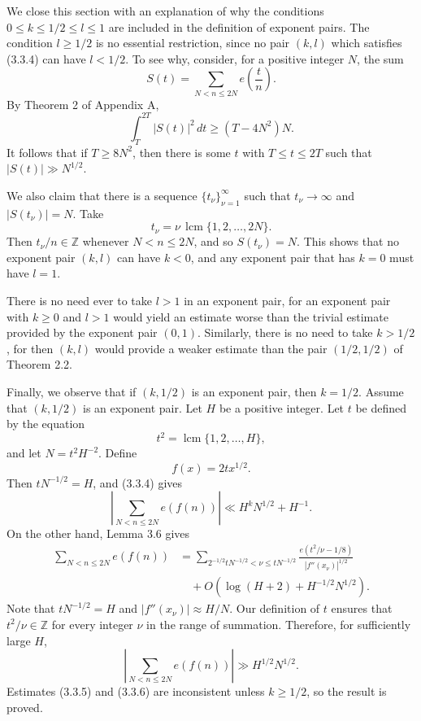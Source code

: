 \documentclass[10pt]{article}
\newcommand{\lcmop}{\operatorname{lcm}}
\begin{document}
We close this section with an explanation of why the conditions
$0\leq k\leq1/2\leq l\leq1$ are included in the definition of exponent
pairs. The condition $l\geq1/2$ is no essential restriction, since no pair
$(k,l)$ which satisfies (3.3.4) can have $l<1/2$. To see why, consider, for a positive integer $N$, the sum
\[
 S(t)=\sum_{N<n\leq2N}e\left(\frac tn\right).
\]
By Theorem 2 of Appendix A,
\[
 \int_T^{2T}|S(t)|^2\,dt\geq(T-4N^2)N.
\]
It follows that if $T\geq8N^2$, then there is some $t$ with
$T\leq t\leq2T$ such that $|S(t)|\gg N^{1/2}$.

We also claim that there is a sequence $\{t_\nu\}_{\nu=1}^{\infty}$ such that
$t_\nu\to\infty$ and $|S(t_\nu)|=N$. Take
\[
 t_\nu=\nu\,\lcmop\{1,2,\ldots,2N\}.
\]
Then $t_\nu/n\in\mathbb Z$ whenever $N<n\leq2N$, and so $S(t_\nu)=N$.
This shows that no exponent pair $(k,l)$ can have $k<0$, and any exponent pair
that has $k=0$ must have $l=1$.

There is no need ever to take $l>1$ in an exponent pair, for an exponent pair
with $k\geq0$ and $l>1$ would yield an estimate worse than the trivial
estimate provided by the exponent pair $(0,1)$. Similarly, there is no need
to take $k>1/2$, for then $(k,l)$ would provide a weaker estimate than the
pair $(1/2,1/2)$ of Theorem 2.2.

Finally, we observe that if $(k,1/2)$ is an exponent pair, then $k=1/2$.
Assume that $(k,1/2)$ is an exponent pair. Let $H$ be a positive integer. Let
$t$ be defined by the equation
\[
 t^2=\lcmop\{1,2,\ldots,H\},
\]
and let $N=t^2H^{-2}$. Define
\[
 f(x)=2t x^{1/2}.
\]
Then $tN^{-1/2}=H$, and (3.3.4) gives
\begin{equation*}
 \left|\sum_{N<n\leq2N}e(f(n))\right|
 \ll H^kN^{1/2}+H^{-1}. \tag{3.3.5}
\end{equation*}
On the other hand, Lemma 3.6 gives
\[
\begin{aligned}
 \sum_{N<n\leq2N}e(f(n))
 &=\sum_{2^{-1/2}tN^{-1/2}<\nu\leq tN^{-1/2}}
  \frac{e(t^2/\nu-1/8)}{|f''(x_\nu)|^{1/2}}\\
 &\quad+O\left(\log(H+2)+H^{-1/2}N^{1/2}\right).
\end{aligned}
\]
Note that $tN^{-1/2}=H$ and $|f''(x_\nu)|\approx H/N$. Our definition of
$t$ ensures that $t^2/\nu\in\mathbb Z$ for every integer $\nu$ in the range
of summation. Therefore, for sufficiently large $H$,
\begin{equation*}
 \left|\sum_{N<n\leq2N}e(f(n))\right|
 \gg H^{1/2}N^{1/2}. \tag{3.3.6}
\end{equation*}
Estimates (3.3.5) and (3.3.6) are inconsistent unless $k\geq1/2$, so the
result is proved.
\end{document}
